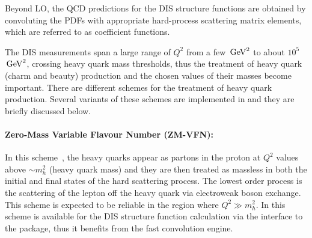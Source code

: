 Beyond LO, the QCD predictions for the DIS structure functions are obtained by convoluting 
the PDFs with appropriate hard-process scattering matrix elements, which are referred to as coefficient functions. 


%

The DIS measurements span a large range of $Q^2$ from a few $\,\text{Ge\hspace{-.08em}V}^2$ to about $10^5$ $\,\text{Ge\hspace{-.08em}V}^2$, crossing heavy quark mass thresholds, thus the treatment of heavy quark (charm and beauty) 
production and the chosen values of their masses become important. 
There are different schemes for the treatment of heavy quark production. 
Several variants of these schemes are implemented in \fitter and they are briefly discussed below.

\paragraph{Zero-Mass Variable Flavour Number (ZM-VFN)\rm:\\}
In this scheme~\cite{ZMVFNpub}, the
heavy quarks appear as partons in the proton at $Q^2$ values above $\sim m_h^2$ (heavy quark mass)
and they
are then treated as massless in both the initial 
and final states of the hard scattering process. The lowest order process is the
scattering of the lepton off the heavy quark via electroweak boson exchange.
This scheme is expected to be reliable in the region where $Q^2 \gg m_h^2$.
In \fitter this scheme is available for the DIS structure function calculation 
via the interface to the \qcdnum \cite{qcdnum} package, thus it benefits 
from the fast \qcdnum convolution engine.

